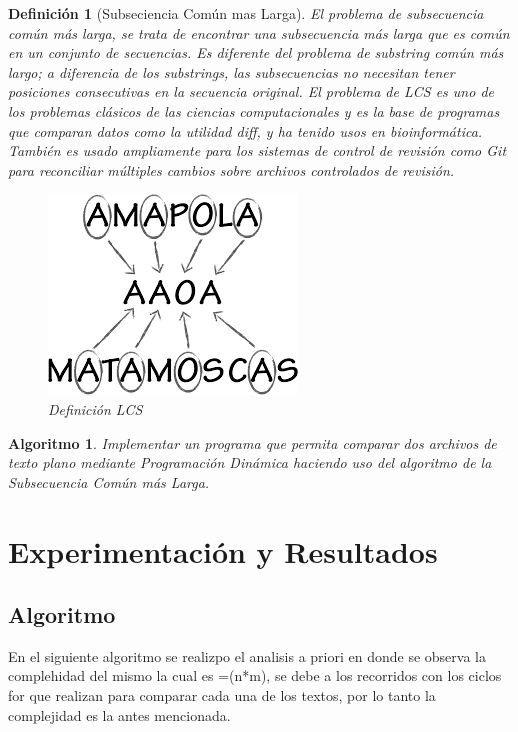 \documentclass[12pt,twoside]{article}
\newtheorem{defi}{Definición}
\newtheorem{algoritmo}{Algoritmo}
\begin{document}
\begin{defi}[Subseciencia Común mas Larga]
El problema de subsecuencia común más larga, se trata de encontrar una subsecuencia más larga que es común en un conjunto de secuencias. Es diferente del problema de substring común más largo; a diferencia de los substrings, las subsecuencias no necesitan tener posiciones consecutivas en la secuencia original. El problema de LCS es uno de los problemas clásicos de las ciencias computacionales y es la base de programas que comparan datos como la utilidad diff, y ha tenido usos en bioinformática. También es usado ampliamente para los sistemas de control de revisión como Git para reconciliar múltiples cambios sobre archivos controlados de revisión.
\\
\begin{figure}[h!]
\centering
\includegraphics[scale=.5]{lcs.png}
\caption{Definición LCS}
\label{fig:universe}
\end{figure}
\end{defi}

\newpage

\begin{algoritmo}
Implementar un programa que permita comparar dos archivos de texto plano mediante Programación Dinámica haciendo uso del algoritmo de la Subsecuencia Común más Larga.



\clearpage

\end{algoritmo}

 \section{Experimentaci\'on y Resultados}

\subsection{Algoritmo}
En el siguiente algoritmo se realizpo el analisis a priori en donde se observa la complehidad del mismo la cual es =(n*m), se debe a los recorridos con los ciclos for que realizan para comparar cada una de los textos, por lo tanto la complejidad es la antes mencionada. 
\end{document}
